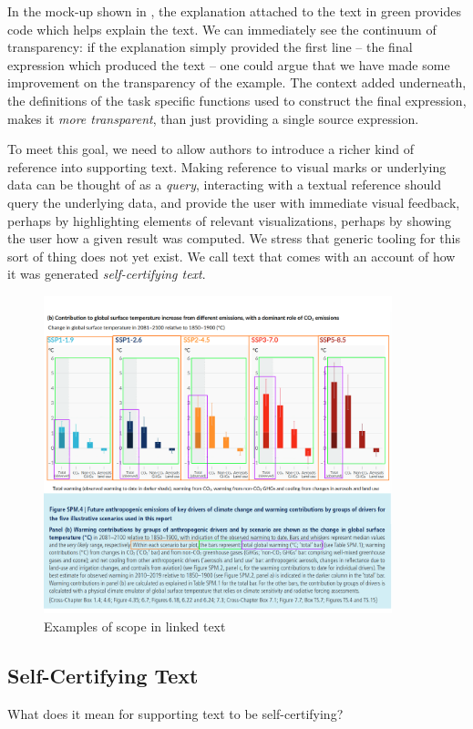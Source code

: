 In the mock-up shown in , the explanation attached to the text in
green provides code which helps explain the text. We can immediately see the continuum of
transparency: if the explanation simply provided the first line -- the final expression which
produced the text -- one could argue that we have made some improvement on the transparency
of the example. The context added underneath, the definitions of the task specific functions
used to construct the final expression, makes it \emph{more transparent}, than just
providing a single source expression.


To meet this goal, we need to allow authors to introduce a richer kind of reference into supporting
text. Making reference to visual marks or underlying data can be thought of as a \emph{query},
interacting with a textual reference should query the underlying data, and provide the user with immediate
visual feedback, perhaps by highlighting elements of relevant visualizations, perhaps by showing the user
how a given result was computed. We stress that generic tooling for this sort of thing does not yet exist.
We call text that comes with an account of how it was generated \emph{self-certifying text}.

\begin{figure}
   \includegraphics[width=0.9\textwidth]{fig/ipcc-visual-elements.png}
   \caption{Examples of scope in linked text}
   \label{fig:visual-element-scope}
\end{figure}

\subsection{Self-Certifying Text}
What does it mean for supporting text to be self-certifying?

